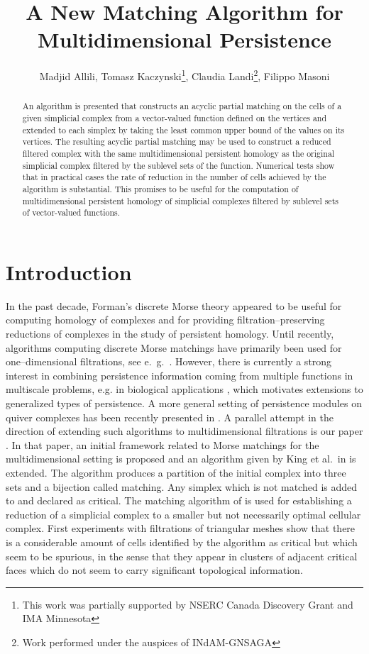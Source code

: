 \documentclass[12pt]{article}
\title{A New Matching Algorithm for Multidimensional Persistence}
\author{Madjid Allili, Tomasz Kaczynski\thanks{This work was partially supported by NSERC Canada Discovery Grant  and IMA Minnesota}, Claudia Landi\thanks{Work  performed under the auspices of INdAM-GNSAGA}, Filippo Masoni}
\begin{document}
\maketitle

\begin{abstract}
An algorithm is presented that constructs an acyclic partial matching on the cells of a given simplicial complex from a vector-valued function defined on the vertices and extended to each simplex by taking the least common upper bound of the values on its vertices. The resulting acyclic partial matching may be used to construct a reduced filtered complex with the same multidimensional persistent homology as the original simplicial complex filtered by the sublevel sets of the function. Numerical tests show that in practical cases the rate of reduction in the number of cells achieved by the algorithm is substantial.  This promises to be useful for the computation of multidimensional persistent homology of  simplicial complexes filtered by  sublevel sets of vector-valued functions.
\end{abstract}

\section{Introduction}\label{sec:intro}

In the past decade, Forman's discrete Morse theory \cite{For98,Forman02} appeared to be useful for computing homology of complexes \cite{Har2014} and for providing filtration--preserving reductions of complexes in the study of persistent homology. Until recently, algorithms computing discrete Morse matchings have primarily been used for one--dimensional filtrations, see e.\ g.\ \cite{KinKnuMra05,RobWooShe11,MiNa}. However, there is currently a strong interest in combining persistence information coming from multiple functions in multiscale problems,  e.g. in biological applications  \cite{xia-wei}, which motivates extensions to generalized types of persistence. A more general setting of persistence modules on quiver complexes has been recently presented in \cite{Esc2014}. A parallel attempt in the direction of extending such algorithms to multidimensional filtrations  is our paper \cite{AlKaLa17}. In that paper, an initial framework related to Morse matchings for the multidimensional setting is proposed and an algorithm given by King et al.\ in \cite{KinKnuMra05} is extended. The algorithm produces a partition of the initial complex into three sets  and a bijection  called matching. Any simplex which is not matched is added to  and declared as critical. The matching algorithm of \cite{AlKaLa17} is used for establishing a reduction of a simplicial complex to a smaller but not necessarily optimal cellular complex. First experiments with filtrations of triangular meshes show that there is a considerable amount of cells identified by the algorithm as critical but which seem to be spurious, in the sense that they appear in clusters of adjacent critical faces which do not seem to carry significant topological information.
\end{document}
